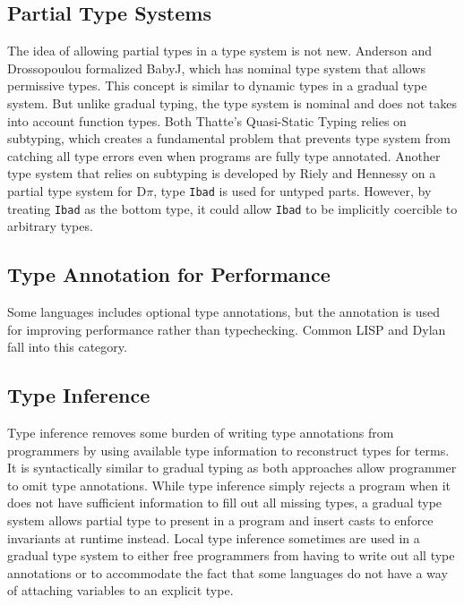 \subsection{Partial Type Systems}
The idea of allowing partial types in a type system is not new.
Anderson and Drossopoulou formalized BabyJ\cite{anderson2003babyj}, which has
nominal type system that allows permissive types.
This concept is similar to dynamic types in a gradual type system.
But unlike gradual typing, the type system is nominal and does not takes into account function types.
Both Thatte's Quasi-Static Typing\cite{thatte1989quasi} relies on subtyping,
which creates a fundamental problem that prevents type system from catching all type errors even when programs are
fully type annotated.
Another type system that relies on subtyping
is developed by Riely and Hennessy\cite{riely1999trust} on a partial type system for D$\pi$,
type \texttt{Ibad} is used for untyped parts. However, by treating \texttt{Ibad} as the bottom type,
it could allow \texttt{Ibad} to be implicitly coercible to arbitrary types.

\subsection{Type Annotation for Performance}
Some languages includes optional type annotations, but
the annotation is used for improving performance rather than
typechecking.
Common LISP\cite{steele1982overview}
and Dylan\cite{feinberg1996dylan,shalit1996dylan} fall into this category.

\subsection{Type Inference}
Type inference \cite{damas1982principal,hindley1969principle,milner1978theory}
removes some burden of writing type annotations from programmers
by using available type information to reconstruct types for terms.
It is syntactically similar to gradual typing as both approaches
allow programmer to omit type annotations.
While type inference simply rejects a program when it
does not have sufficient information to fill out all missing types,
a gradual type system allows partial type to present in a program and insert casts
to enforce invariants at runtime instead.
Local type inference \cite{pierce2000local} sometimes are used in a gradual type
system to either free programmers from having to write out all type annotations
or to accommodate the fact that some languages do not have a way of attaching
variables to an explicit type.

